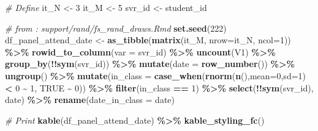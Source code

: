 \documentclass[
]{book}
\newenvironment{Shaded}{\begin{snugshade}}{\end{snugshade}}
\newcommand{\CommentTok}[1]{\textcolor[rgb]{0.56,0.35,0.01}{\textit{#1}}}
\newcommand{\DataTypeTok}[1]{\textcolor[rgb]{0.13,0.29,0.53}{#1}}
\newcommand{\DecValTok}[1]{\textcolor[rgb]{0.00,0.00,0.81}{#1}}
\newcommand{\KeywordTok}[1]{\textcolor[rgb]{0.13,0.29,0.53}{\textbf{#1}}}
\newcommand{\NormalTok}[1]{#1}
\newcommand{\OperatorTok}[1]{\textcolor[rgb]{0.81,0.36,0.00}{\textbf{#1}}}
\newcommand{\OtherTok}[1]{\textcolor[rgb]{0.56,0.35,0.01}{#1}}
\newcommand{\StringTok}[1]{\textcolor[rgb]{0.31,0.60,0.02}{#1}}
\begin{document}
\begin{Shaded}
\begin{Highlighting}[]
\CommentTok{\# Define}
\NormalTok{it\_N \textless{}{-}}\StringTok{ }\DecValTok{3}
\NormalTok{it\_M \textless{}{-}}\StringTok{ }\DecValTok{5}
\NormalTok{svr\_id \textless{}{-}}\StringTok{ \textquotesingle{}student\_id\textquotesingle{}}

\CommentTok{\# from : support/rand/fs\_rand\_draws.Rmd}
\KeywordTok{set.seed}\NormalTok{(}\DecValTok{222}\NormalTok{)}
\NormalTok{df\_panel\_attend\_date \textless{}{-}}\StringTok{ }\KeywordTok{as\_tibble}\NormalTok{(}\KeywordTok{matrix}\NormalTok{(it\_M, }\DataTypeTok{nrow=}\NormalTok{it\_N, }\DataTypeTok{ncol=}\DecValTok{1}\NormalTok{)) }\OperatorTok{\%\textgreater{}\%}
\StringTok{  }\KeywordTok{rowid\_to\_column}\NormalTok{(}\DataTypeTok{var =}\NormalTok{ svr\_id) }\OperatorTok{\%\textgreater{}\%}
\StringTok{  }\KeywordTok{uncount}\NormalTok{(V1) }\OperatorTok{\%\textgreater{}\%}
\StringTok{  }\KeywordTok{group\_by}\NormalTok{(}\OperatorTok{!!}\KeywordTok{sym}\NormalTok{(svr\_id)) }\OperatorTok{\%\textgreater{}\%}\StringTok{ }\KeywordTok{mutate}\NormalTok{(}\DataTypeTok{date =} \KeywordTok{row\_number}\NormalTok{()) }\OperatorTok{\%\textgreater{}\%}
\StringTok{  }\KeywordTok{ungroup}\NormalTok{() }\OperatorTok{\%\textgreater{}\%}\StringTok{ }\KeywordTok{mutate}\NormalTok{(}\DataTypeTok{in\_class =} \KeywordTok{case\_when}\NormalTok{(}\KeywordTok{rnorm}\NormalTok{(}\KeywordTok{n}\NormalTok{(),}\DataTypeTok{mean=}\DecValTok{0}\NormalTok{,}\DataTypeTok{sd=}\DecValTok{1}\NormalTok{) }\OperatorTok{\textless{}}\StringTok{ }\DecValTok{0} \OperatorTok{\textasciitilde{}}\StringTok{ }\DecValTok{1}\NormalTok{, }\OtherTok{TRUE} \OperatorTok{\textasciitilde{}}\StringTok{ }\DecValTok{0}\NormalTok{)) }\OperatorTok{\%\textgreater{}\%}
\StringTok{  }\KeywordTok{filter}\NormalTok{(in\_class }\OperatorTok{==}\StringTok{ }\DecValTok{1}\NormalTok{) }\OperatorTok{\%\textgreater{}\%}\StringTok{ }\KeywordTok{select}\NormalTok{(}\OperatorTok{!!}\KeywordTok{sym}\NormalTok{(svr\_id), date) }\OperatorTok{\%\textgreater{}\%}
\StringTok{  }\KeywordTok{rename}\NormalTok{(}\DataTypeTok{date\_in\_class =}\NormalTok{ date)}

\CommentTok{\# Print}
\KeywordTok{kable}\NormalTok{(df\_panel\_attend\_date) }\OperatorTok{\%\textgreater{}\%}
\StringTok{  }\KeywordTok{kable\_styling\_fc}\NormalTok{()}
\end{Highlighting}
\end{Shaded}
\end{document}
